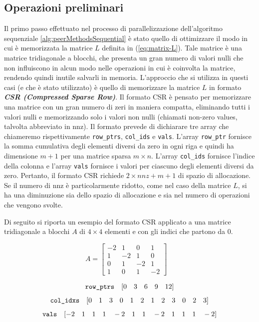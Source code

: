 \subsection{Operazioni preliminari} \label{subsec:approccio-parallelo-operazioni-preliminari}
\noindent Il primo passo effettuato nel processo di parallelizzazione dell'algoritmo sequenziale \ref{alg:peerMethodsSequential} è stato quello di ottimizzare il modo in cui è memorizzata la matrice $L$ definita in (\ref{eq:matrix-L}). Tale matrice è una matrice tridiagonale a blocchi, che presenta un gran numero di valori nulli che non influiscono in alcun modo nelle operazioni in cui è coinvolta la matrice, rendendo quindi inutile salvarli in memoria. L'approccio che si utilizza in questi casi (e che è stato utilizzato) è quello di memorizzare la matrice $L$ in formato \textit{\textbf{CSR (Compressed Sparse Row)}}. Il formato CSR è pensato per memorizzare una matrice con un gran numero di zeri in maniera compatta, eliminando tutti i valori nulli e memorizzando solo i valori non nulli (chiamati non-zero values, talvolta abbreviato in nnz). Il formato prevede di dichiarare tre array che chiameremo rispettivamente \texttt{row\_ptrs}, \texttt{col\_ids} e \texttt{vals}. L'array \texttt{row\_ptr} fornisce la somma cumulativa degli elementi diversi da zero in ogni riga e quindi ha dimensione $m + 1$ per una matrice sparsa $m \times n$. L'array \texttt{col\_ids} fornisce l'indice della colonna e l'array \texttt{vals} fornisce i valori per ciascuno degli elementi diversi da zero. Pertanto, il formato CSR richiede $2 \times nnz + m + 1$ di spazio di allocazione. Se il numero di nnz è particolarmente ridotto, come nel caso della matrice $L$, si ha una diminuzione sia dello spazio di allocazione e sia nel numero di operazioni che vengono svolte.

\noindent Di seguito si riporta un esempio del formato CSR applicato a una matrice tridiagonale a blocchi $A$ di $4 \times 4$ elementi e con gli indici che partono da 0.

\begin{equation*}
    A = \begin{bmatrix} 
	-2 & 1 & 0 & 1\\
	1 & -2 & 1 & 0\\
	0 & 1 & -2 & 1\\
    1 & 0 & 1 & -2
	\end{bmatrix}
	\quad
\end{equation*}

\begin{equation*}
    \texttt{row\_ptrs} \quad [0 \quad 3 \quad 6 \quad 9 \quad 12] \\
\end{equation*}
\begin{equation*}
    \texttt{col\_idxs} \quad [0 \quad 1 \quad 3 \quad 0 \quad 1 \quad 2 \quad 1 \quad 2 \quad 3 \quad 0 \quad 2 \quad 3] \\
\end{equation*}
\begin{equation*}
    \texttt{vals} \quad [-2 \quad 1 \quad 1 \quad  1 \quad -2 \quad 1 \quad 1 \quad -2 \quad 1 \quad 1 \quad 1 \quad -2] \\
\end{equation*}


